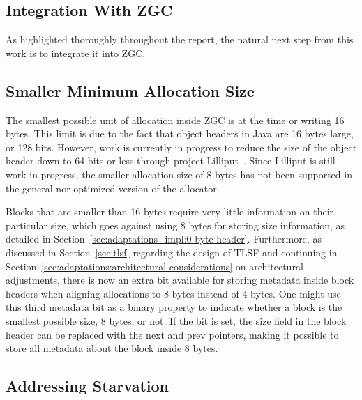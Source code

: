 
\subsection{Integration With ZGC}
\label{sec:future-work:integration}

As highlighted thoroughly throughout the report, the natural next step from this work is to integrate it into ZGC.

\subsection{Smaller Minimum Allocation Size}
\label{sec:future-work:lilliput}

The smallest possible unit of allocation inside ZGC is at the time or writing 16 bytes. This limit is due to the fact that object headers in Java are 16 bytes large, or 128 bits. However, work is currently in progress to reduce the size of the object header down to 64 bits or less through project Lilliput~\cite{lilliput}. Since Lilliput is still work in progress, the smaller allocation size of 8 bytes has not been supported in the general nor optimized version of the allocator.

Blocks that are smaller than 16 bytes require very little information on their particular size, which goes against using 8 bytes for storing size information, as detailed in Section~\ref{sec:adaptations_impl:0-byte-header}. Furthermore, as discussed in Section~\ref{sec:tlsf} regarding the design of TLSF and continuing in Section~\ref{sec:adaptations:architectural-considerations} on architectural adjustments, there is now an extra bit available for storing metadata inside block headers when aligning allocations to 8 bytes instead of 4 bytes. One might use this third metadata bit as a binary property to indicate whether a block is the smallest possible size, 8 bytes, or not. If the bit is set, the size field in the block header can be replaced with the next and prev pointers, making it possible to store all metadata about the block inside 8 bytes.


\subsection{Addressing Starvation}
\label{sec:future-work:starvation}

